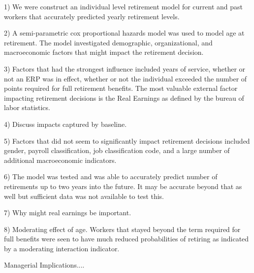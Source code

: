\documentclass[12pt,letterpaper]{article}
\begin{document}
1) We were construct an individual level retirement model for current and past workers that accurately predicted yearly retirement levels.

2) A semi-parametric cox proportional hazards model was used to model age at retirement.  The model investigated demographic, organizational, and macroeconomic factors that might impact the retirement decision.

3) Factors that had the strongest influence included years of service, whether or not an ERP was in effect, whether or not the individual exceeded the number of points required for full retirement benefits.  The most valuable external factor impacting retirement decisions is the Real Earnings as defined by the bureau of labor statistics.

4) Discuss impacts captured by baseline.

5) Factors that did not seem to significantly impact retirement decisions included gender, payroll classification, job classification code, and a large number of additional macroeconomic indicators.

6) The model was tested and was able to accurately predict number of retirements up to two years into the future.  It may be accurate beyond that as well but sufficient data was not available to test this.

7) Why might real earnings be important.

8) Moderating effect of age.  Workers that stayed beyond the term required for full benefits were seen to have much reduced probabilities of retiring as indicated by a moderating interaction indicator.


Managerial Implications....

	
\end{document}
